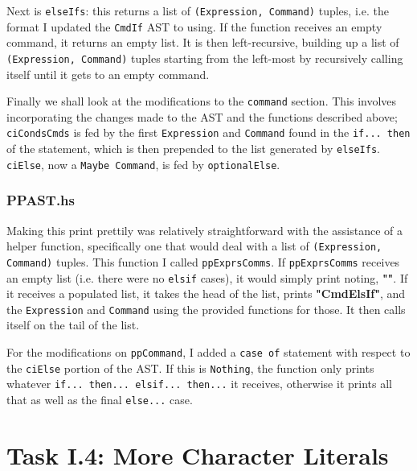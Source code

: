 \documentclass[12pt]{article}
\newcommand{\lstin}[3]{
  
}
\begin{document}
\lstin{133}{135}{Parser.y}

Next is \verb|elseIfs|: this returns a list of \verb|(Expression, Command)| tuples, i.e. the format I updated the \verb|CmdIf| AST to using. 
If the function receives an empty command, it returns an empty list. 
It is then left-recursive, building up a list of \verb|(Expression, Command)| tuples starting from the left-most by recursively calling itself until it gets to an empty command.

\lstin{137}{139}{Parser.y}

Finally we shall look at the modifications to the \verb|command| section. 
This involves incorporating the changes made to the AST and the functions described above; \verb|ciCondsCmds| is fed by the first \verb|Expression| and \verb|Command| found in the \verb|if... then| of the statement, which is then prepended to the list generated by \verb|elseIfs|. 
\verb|ciElse|, now a \verb|Maybe Command|, is fed by \verb|optionalElse|.

\lstin{118}{119}{Parser.y}

\subsubsection{PPAST.hs}
Making this print prettily was relatively straightforward with the assistance of a helper function, specifically one that would deal with a list of \verb|(Expression, Command)| tuples. 
This function I called \verb|ppExprsComms|. 
If \verb|ppExprsComms| receives an empty list (i.e. there were no \verb|elsif| cases), it would simply print noting, \textbf{""}. 
If it receives a populated list, it takes the head of the list, prints \textbf{"CmdElsIf"}, and the \verb|Expression| and \verb|Command| using the provided functions for those. 
It then calls itself on the tail of the list.

\lstin{75}{79}{PPAST.hs}

For the modifications on \verb|ppCommand|, I added a \verb|case of| statement with respect to the \verb|ciElse| portion of the AST. 
If this is \verb|Nothing|, the function only prints whatever \verb|if... then... elsif... then...| it receives, otherwise it prints all that as well as the final \verb|else...| case.

\lstin{54}{61}{PPAST.hs}

\iffalse
\section{Task I.4: More Character Literals}
\end{document}
